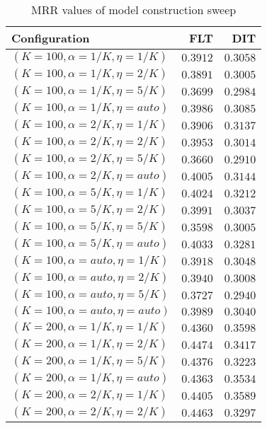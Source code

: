 
\begin{table}
\begin{spacing}{1.2}
\centering
\caption{MRR values of \zookeeper model construction sweep}
\label{table:zookeeper_model_sweep}
\vspace{0.2em}
\parbox{.45\linewidth}{\centering \begin{tabular}{lrr}
\toprule
                   Configuration &      FLT &      DIT \\
\midrule
   $(K=100,\alpha=1/K,\eta=1/K)$ & $0.3912$ & $0.3058$ \\
   $(K=100,\alpha=1/K,\eta=2/K)$ & $0.3891$ & $0.3005$ \\
   $(K=100,\alpha=1/K,\eta=5/K)$ & $0.3699$ & $0.2984$ \\
  $(K=100,\alpha=1/K,\eta=auto)$ & $0.3986$ & $0.3085$ \\
   $(K=100,\alpha=2/K,\eta=1/K)$ & $0.3906$ & $0.3137$ \\
   $(K=100,\alpha=2/K,\eta=2/K)$ & $0.3953$ & $0.3014$ \\
   $(K=100,\alpha=2/K,\eta=5/K)$ & $0.3660$ & $0.2910$ \\
  $(K=100,\alpha=2/K,\eta=auto)$ & $0.4005$ & $0.3144$ \\
   $(K=100,\alpha=5/K,\eta=1/K)$ & $0.4024$ & $0.3212$ \\
   $(K=100,\alpha=5/K,\eta=2/K)$ & $0.3991$ & $0.3037$ \\
   $(K=100,\alpha=5/K,\eta=5/K)$ & $0.3598$ & $0.3005$ \\
  $(K=100,\alpha=5/K,\eta=auto)$ & $0.4033$ & $0.3281$ \\
  $(K=100,\alpha=auto,\eta=1/K)$ & $0.3918$ & $0.3048$ \\
  $(K=100,\alpha=auto,\eta=2/K)$ & $0.3940$ & $0.3008$ \\
  $(K=100,\alpha=auto,\eta=5/K)$ & $0.3727$ & $0.2940$ \\
 $(K=100,\alpha=auto,\eta=auto)$ & $0.3989$ & $0.3040$ \\
   $(K=200,\alpha=1/K,\eta=1/K)$ & $0.4360$ & $0.3598$ \\
   $(K=200,\alpha=1/K,\eta=2/K)$ & $0.4474$ & $0.3417$ \\
   $(K=200,\alpha=1/K,\eta=5/K)$ & $0.4376$ & $0.3223$ \\
  $(K=200,\alpha=1/K,\eta=auto)$ & $0.4363$ & $0.3534$ \\
   $(K=200,\alpha=2/K,\eta=1/K)$ & $0.4405$ & $0.3589$ \\
   $(K=200,\alpha=2/K,\eta=2/K)$ & $0.4463$ & $0.3297$ \\

\end{tabular}}
\end{spacing}
\end{table}
